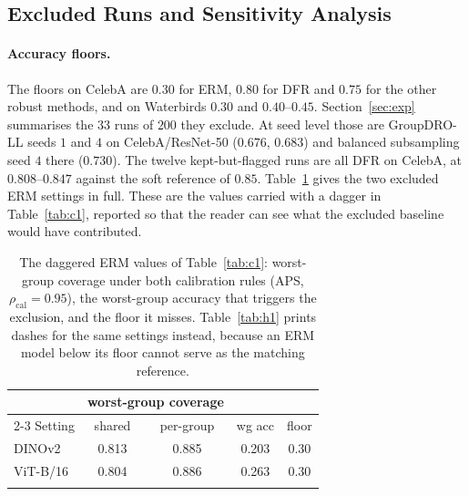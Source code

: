 \documentclass[pdflatex,sn-basic]{sn-jnl}%
\theoremstyle{thmstyleone}%
\newcommand{\rhocal}{\rho_{\mathrm{cal}}}
\begin{document}
\begin{appendices}
\section{Excluded Runs and Sensitivity Analysis}
\label{app:excl}

\paragraph{Accuracy floors.} The floors on CelebA are $0.30$ for ERM, $0.80$ for DFR and $0.75$
for the other robust methods, and on Waterbirds $0.30$ and $0.40$--$0.45$. Section~\ref{sec:exp} summarises the $33$ runs
of $200$ they exclude. At seed level those are GroupDRO-LL seeds $1$ and $4$ on CelebA/ResNet-50
($0.676$, $0.683$) and balanced subsampling seed $4$ there ($0.730$). The twelve kept-but-flagged
runs are all DFR on CelebA, at $0.808$--$0.847$ against the soft reference of $0.85$.
Table~\ref{tab:dagger} gives the two excluded ERM settings in full. These are the values carried
with a dagger in Table~\ref{tab:c1}, reported so that the reader can see what the
excluded baseline would have contributed.

\begin{table}[!ht]
\caption{The daggered ERM values of Table~\ref{tab:c1}: worst-group coverage under both calibration rules (APS, $\rhocal=0.95$), the worst-group accuracy that triggers the exclusion, and the floor it misses. Table~\ref{tab:h1} prints dashes for the same settings instead, because an ERM model below its floor cannot serve as the matching reference.}
\label{tab:dagger}
\footnotesize
\setlength{\tabcolsep}{5pt}
\begin{tabular}{@{}lcccc@{}}
\toprule
 & \multicolumn{2}{c}{worst-group coverage} & & \\
\cmidrule(lr){2-3}
Setting & shared & per-group & wg acc & floor \\
\midrule
DINOv2 & 0.813 & 0.885 & 0.203 & 0.30 \\
ViT-B/16 & 0.804 & 0.886 & 0.263 & 0.30 \\
\botrule
\end{tabular}
\end{table}


\end{appendices}
\end{document}
